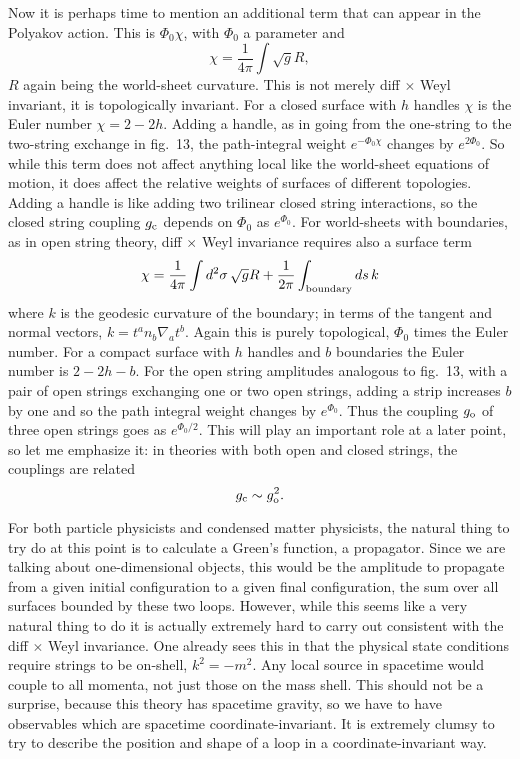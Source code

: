 Now it is perhaps time to mention an additional term that can
appear in the Polyakov action.  This is $\Phi_0 \chi$, with $\Phi_0$
a parameter and
\begin{equation}
\chi = \frac{1}{4\pi} \int \sqrt{g}R,
\end{equation}
$R$ again being the world-sheet curvature.
This is not merely diff $\times$ Weyl
invariant, it is topologically invariant.  For a closed surface with
$h$ handles $\chi$ is the Euler number $\chi = 2 - 2h$.
Adding a handle, as in going from the one-string to the two-string
exchange in fig.~13, the path-integral weight $e^{- \Phi_0 \chi}$
changes by $e^{2\Phi_0}$.  So while this term does not affect
anything local like the world-sheet equations of motion, it does
affect the relative weights of surfaces of different topologies.
Adding a handle is like adding two trilinear closed string
interactions, so the closed string coupling $g_{\rm c}$ depends on
$\Phi_0$ as
$e^{\Phi_0}$.  For world-sheets with boundaries, as in open
string theory, diff $\times$ Weyl invariance requires also a surface
term
\begin{equation}
\chi = \frac{1}{4\pi} \int  d^2\sigma\, \sqrt{g} R +
\frac{1}{2\pi} \int_{\rm boundary} ds\, k
\end{equation}
where $k$ is the geodesic curvature of
the boundary; in terms of the tangent and normal vectors, $k = t^a n_b
\nabla_a t^b$.  Again this is purely topological, $\Phi_0$ times the
Euler number. For a compact surface with $h$ handles and $b$
boundaries the Euler number is $2 - 2h - b$.
For the open string amplitudes analogous to fig.~13, with a pair of open
strings exchanging one or two open strings, adding a strip increases $b$
by one and so the path integral weight changes by $e^{\Phi_0}$.  Thus the
coupling $g_{\rm o}$ of three open strings goes as $e^{\Phi_0/2}$. 
This will play an important role at a later point, so let me
emphasize it: in theories with both open and closed strings, the
couplings are related 
\begin{equation}
g_{\rm c} \sim g_{\rm o}^2 .
\end{equation}

For both particle physicists and condensed matter physicists, the
natural thing to try do at this point is to calculate a Green's
function, a propagator.  Since we are talking about one-dimensional
objects, this would be the amplitude to propagate from a given initial
configuration to a given final configuration, the sum over all
surfaces bounded by these two loops.  However, 
while this seems like a very natural thing to do it is actually
extremely hard to carry out consistent with the diff $\times$ Weyl
invariance.  One already sees this in that the physical
state conditions require strings to be on-shell, $k^2 = - m^2$.
Any local source in spacetime would couple to all momenta, not
just those on the mass shell.  This should not be a surprise,
because this theory has spacetime gravity, so we have to have
observables which are spacetime coordinate-invariant.  It is
extremely clumsy to try to describe the position and shape of a loop
in a coordinate-invariant way.

